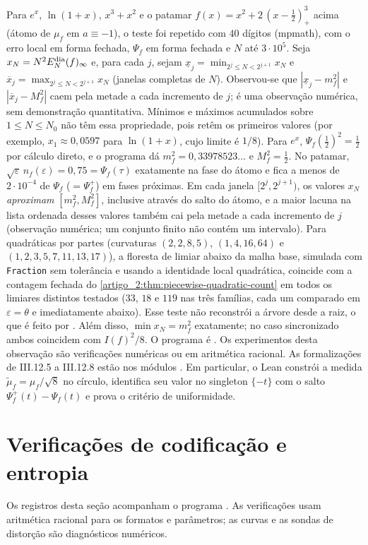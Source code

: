 \begin{remark}
Para $e^x$, $\ln(1+x)$, $x^3+x^2$ e o patamar $f(x)=x^2+2\,(x-\tfrac12)_+^3$
acima (átomo de $\mu_f$ em $a\equiv-1$), o teste foi repetido com $40$ dígitos
(mpmath), com o erro local em forma fechada, $\Psi_f$ em forma fechada e
$N$ até $3\cdot10^5$. Seja $x_N=N^2E_N^{\rm dia}(f)_\infty$ e, para cada $j$, sejam
$\underline x_j=\min_{2^j\le N<2^{j+1}}x_N$ e $\overline x_j=\max_{2^j\le N<2^{j+1}}x_N$
(janelas completas de $N$). Observou-se que $|\underline x_j-m_f^2|$ e $|\overline x_j-M_f^2|$
caem pela metade a cada incremento de $j$; é uma observação numérica, sem
demonstração quantitativa. Mínimos e máximos acumulados sobre $1\le N\le N_0$
não têm essa propriedade, pois retêm os primeiros valores (por exemplo,
$x_1\approx0{,}0597$ para $\ln(1+x)$, cujo limite é $1/8$). Para $e^x$, $\Psi_f(\tfrac12)^2=\tfrac12$ por
cálculo direto, e o programa dá $m_f^2=0{,}33978523\ldots$ e $M_f^2=\tfrac12$.
No patamar, $\sqrt\varepsilon\,n_f(\varepsilon)=0{,}75=\Psi_f(\tau)$ exatamente na
fase do átomo e fica a menos de $2\cdot10^{-4}$ de $\Psi_f$ ($=\Psi_f^+$) em fases próximas.
Em cada janela $[2^j,2^{j+1})$, os valores $x_N$ \emph{aproximam}
$[m_f^2,M_f^2]$, inclusive através do salto do átomo, e a maior lacuna na lista
ordenada desses valores também cai pela metade a cada incremento de $j$
(observação numérica; um conjunto finito não contém um intervalo).
Para quadráticas por partes (curvaturas
$(2,2,8,5)$, $(1,4,16,64)$ e $(1,2,3,5,7,11,13,17)$), a floresta de limiar
abaixo da malha base, simulada com \texttt{Fraction} sem tolerância e usando a
identidade local quadrática, coincide com a contagem fechada do
\cref{artigo_2:thm:piecewise-quadratic-count} em todos os limiares distintos
testados ($33$, $18$ e $119$ nas três famílias, cada um comparado em $\varepsilon=\theta$
e imediatamente abaixo). Esse teste não reconstrói a árvore desde a raiz, o que
é feito por . Além disso,
$\min x_N=m_f^2$ exatamente; no caso sincronizado ambos coincidem com
$I(f)^2/8$. O programa é . Os
experimentos desta observação são verificações numéricas ou em aritmética
racional. As formalizações de III.12.5 a III.12.8 estão nos módulos
. Em particular, o Lean
constrói a medida $\tilde\mu_f=\mu_f/\sqrt8$ no círculo, identifica seu valor no
singleton $\{-t\}$ com o salto $\Psi_f^+(t)-\Psi_f(t)$ e prova o critério
de uniformidade.
\end{remark}

\section{Verificações de codificação e entropia}
\label{artigo_2:sec:coding-validation}
Os registros desta seção acompanham o programa . As verificações usam aritmética racional para os formatos e parâmetros; as curvas e as sondas de distorção são diagnósticos numéricos.

